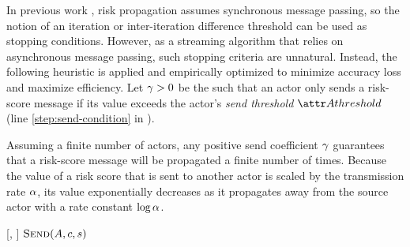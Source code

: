 In previous work \cite{Ayday2021}, risk propagation assumes synchronous message passing, so the notion of an iteration or inter-iteration difference threshold can be used as stopping conditions. However, as a streaming algorithm that relies on asynchronous message passing, such stopping criteria are unnatural. Instead, the following heuristic is applied and empirically optimized to minimize accuracy loss and maximize efficiency. Let $\gamma > 0$ be the  such that an actor only sends a risk-score message if its value exceeds the actor's \emph{send threshold} $\aThreshold{\vActor}$ (line \ref{step:send-condition} in \cPropagate).

Assuming a finite number of actors, any positive send coefficient $\gamma$ guarantees that a risk-score message will be propagated a finite number of times. Because the value of a risk score that is sent to another actor is scaled by the transmission rate $\alpha$, its value exponentially decreases as it propagates away from the source actor with a rate constant $\log \alpha$.

%
\begin{function}{\nPropagate}[\vActor, \vScore]
    \ForEach{$\vContact \in \aActorContacts$}
    	\State $\cSend[\vActor, \vContact, \vScore]$
    \EndFor
\end{function}

